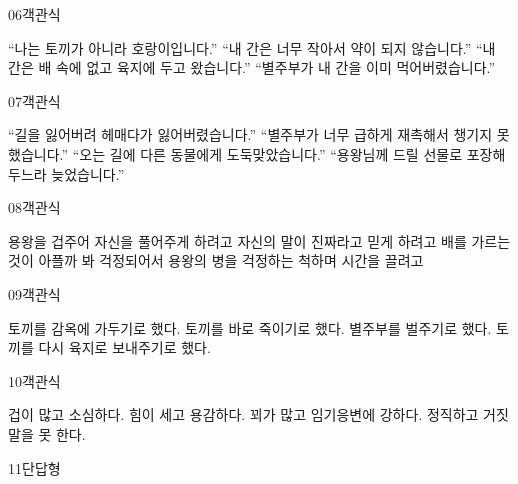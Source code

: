\documentclass[fs95,seriesFre]{korfarm-base}
\begin{document}
\begin{kfQBlock}{06}{객관식}
\begin{kfChoices}
\kfChoice “나는 토끼가 아니라 호랑이입니다.”
\kfChoice “내 간은 너무 작아서 약이 되지 않습니다.”
\kfChoice “내 간은 배 속에 없고 육지에 두고 왔습니다.”
\kfChoice “별주부가 내 간을 이미 먹어버렸습니다.”
\end{kfChoices}
\end{kfQBlock}
\begin{kfQBlock}{07}{객관식}
\begin{kfChoices}
\kfChoice “길을 잃어버려 헤매다가 잃어버렸습니다.”
\kfChoice “별주부가 너무 급하게 재촉해서 챙기지 못했습니다.”
\kfChoice “오는 길에 다른 동물에게 도둑맞았습니다.”
\kfChoice “용왕님께 드릴 선물로 포장해 두느라 늦었습니다.”
\end{kfChoices}
\end{kfQBlock}
\begin{kfQBlock}{08}{객관식}
\begin{kfChoices}
\kfChoice 용왕을 겁주어 자신을 풀어주게 하려고
\kfChoice 자신의 말이 진짜라고 믿게 하려고
\kfChoice 배를 가르는 것이 아플까 봐 걱정되어서
\kfChoice 용왕의 병을 걱정하는 척하며 시간을 끌려고
\end{kfChoices}
\end{kfQBlock}
\begin{kfQBlock}{09}{객관식}
\begin{kfChoices}
\kfChoice 토끼를 감옥에 가두기로 했다.
\kfChoice 토끼를 바로 죽이기로 했다.
\kfChoice 별주부를 벌주기로 했다.
\kfChoice 토끼를 다시 육지로 보내주기로 했다.
\end{kfChoices}
\end{kfQBlock}
\begin{kfQBlock}{10}{객관식}
\begin{kfChoices}
\kfChoice 겁이 많고 소심하다.
\kfChoice 힘이 세고 용감하다.
\kfChoice 꾀가 많고 임기응변에 강하다.
\kfChoice 정직하고 거짓말을 못 한다.
\end{kfChoices}
\end{kfQBlock}
\begin{kfQBlock}{11}{단답형}
\end{kfQBlock}
\end{document}
